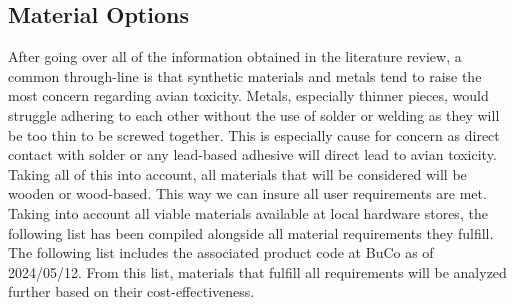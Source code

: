 \documentclass[class=report,11pt,crop=false]{standalone}
\begin{document}
\subsection{Material Options}
After going over all of the information obtained in the literature review, a common through-line is that synthetic materials and metals tend to raise the most concern regarding avian toxicity. Metals, especially thinner pieces, would struggle adhering to each other without the use of solder or welding as they will be too thin to be screwed together. This is especially cause for concern as direct contact with solder or any lead-based adhesive will direct lead to avian toxicity. Taking all of this into account, all materials that will be considered will be wooden or wood-based. This way we can insure all user requirements are met.
Taking into account all viable materials available at local hardware stores, the following list has been compiled alongside all material requirements they fulfill. The following list includes the associated product code at BuCo as of 2024/05/12. From this list, materials that fulfill all requirements will be analyzed further based on their cost-effectiveness.
\end{document}
